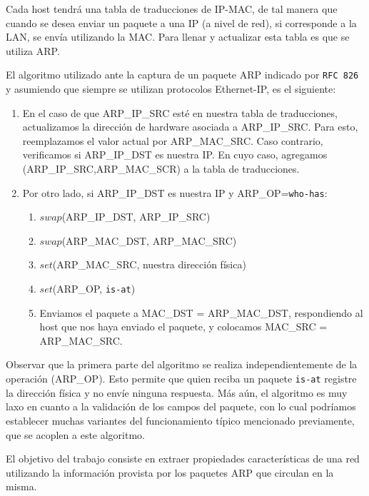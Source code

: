 Cada host tendrá una tabla de traducciones de IP-MAC, de tal manera que cuando se desea enviar un paquete a una IP (a nivel de red), si corresponde
a la LAN, se envía utilizando la MAC. Para llenar y actualizar esta tabla es que se utiliza ARP.

El algoritmo utilizado ante la captura de un paquete ARP indicado por {\tt RFC 826} y asumiendo que siempre
se utilizan protocolos Ethernet-IP, es el siguiente:

\begin{enumerate}
 \item En el caso de que ARP\_IP\_SRC esté en nuestra tabla de traducciones, actualizamos la dirección de hardware asociada a ARP\_IP\_SRC. Para esto, reemplazamos el valor actual por ARP\_MAC\_SRC. Caso contrario, verificamos si ARP\_IP\_DST es nuestra IP. En cuyo caso, agregamos (ARP\_IP\_SRC,ARP\_MAC\_SCR) a la tabla de traducciones.
 \item Por otro lado, si ARP\_IP\_DST es nuestra IP y ARP\_OP={\tt who-has}:
  \begin{enumerate}
   \item $swap$(ARP\_IP\_DST, ARP\_IP\_SRC)
   \item $swap$(ARP\_MAC\_DST, ARP\_MAC\_SRC)
   \item $set$(ARP\_MAC\_SRC, nuestra dirección física)
   \item $set$(ARP\_OP, {\tt is-at})
   \item Enviamos el paquete a MAC\_DST = ARP\_MAC\_DST, respondiendo al host que nos haya enviado el paquete, y colocamos MAC\_SRC = ARP\_MAC\_SRC.
  \end{enumerate}
\end{enumerate}

Observar que la primera parte del algoritmo se realiza independientemente de la operación (ARP\_OP). Esto permite que quien reciba un paquete {\tt is-at}
registre la dirección física y no envíe ninguna respuesta. Más aún, el algoritmo es muy laxo en cuanto a la validación de los campos del paquete,
con lo cual podríamos establecer muchas variantes del funcionamiento típico mencionado previamente, que se acoplen a este algoritmo.

El objetivo del trabajo consiste en extraer propiedades características de una red utilizando la información provista por los paquetes ARP que
circulan en la misma.